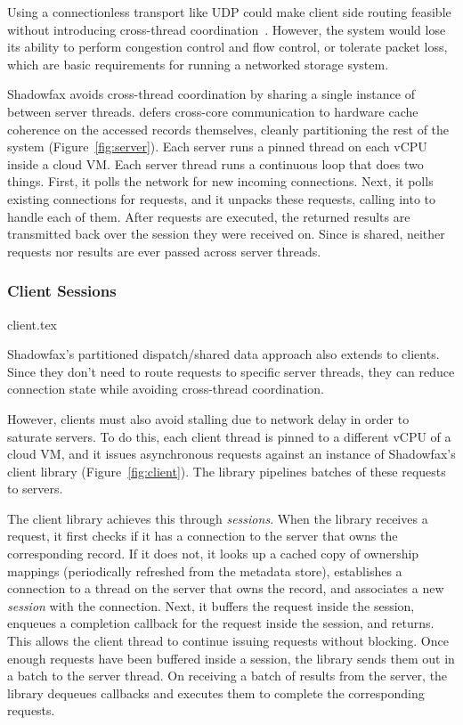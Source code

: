 Using a connectionless transport like UDP could make client side routing
feasible without introducing cross-thread coordination~\cite{fb-memcache,mica}.
%
However, the system would lose its ability to perform congestion
control and flow control, or tolerate packet loss, which
are basic requirements for running a
networked storage system.

Shadowfax avoids cross-thread coordination by sharing a single
instance of \faster between server threads.
%
\faster defers cross-core communication to hardware cache coherence on the
accessed records themselves, cleanly partitioning the rest of the system
(Figure~\ref{fig:server}).
%
Each server runs a pinned thread on each vCPU inside a cloud VM.
%
Each server thread runs a continuous loop that does two things.
%
First, it polls the network for new incoming connections.
%
Next, it polls existing connections for requests, and it unpacks these
requests, calling into \faster to handle each of them.
%
After requests are executed, the returned results are
transmitted back over the session they were received on.
%
Since \faster is shared, neither requests nor results are ever passed across
server threads.

\subsubsection{Client Sessions}
\label{sec:sessions}

 {client.tex}

Shadowfax's partitioned dispatch/shared data approach also extends to
clients.
%
Since they don't need to route requests to specific server threads, they
can reduce connection state while avoiding cross-thread coordination.

However, clients must also avoid stalling due to network delay in order to
saturate servers.
%
To do this, each client thread is pinned to a different vCPU of a cloud VM,
and it issues asynchronous requests against an instance of
Shadowfax's client library (Figure~\ref{fig:client}).
%
The library pipelines batches of these requests to servers.

The client library achieves this through \emph{sessions}.
%
When the library receives a request, it first checks if it has a
connection to the server that owns the corresponding record.
%
If it does not, it looks up a cached copy of ownership mappings
(periodically refreshed from the metadata store), establishes a
connection to a thread on the server that owns the record, and
associates a new \emph{session} with the connection.
%
Next, it buffers the request inside the session, enqueues a
completion callback for the request inside the session, and returns.
%
This allows the client thread to continue issuing requests without
blocking.
%
Once enough requests have been buffered inside a session, the
library sends them out in a batch to the server thread.
%
On receiving a batch of results from the server, the library
dequeues callbacks and executes them to complete the corresponding
requests.

